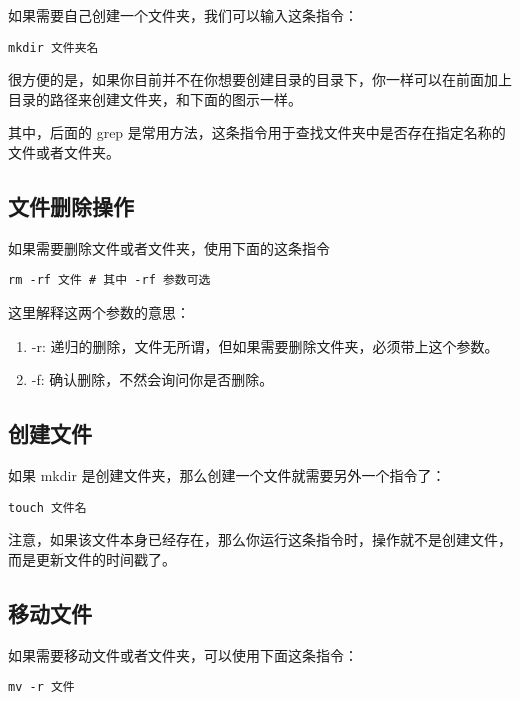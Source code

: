 \documentclass[UTF8]{gyh}
\begin{document}
如果需要自己创建一个文件夹，我们可以输入这条指令：

\begin{lstlisting}
mkdir 文件夹名
\end{lstlisting}

很方便的是，如果你目前并不在你想要创建目录的目录下，你一样可以在前面加上目录的路径来创建文件夹，和下面的图示一样。


其中，后面的 grep 是常用方法，这条指令用于查找文件夹中是否存在指定名称的文件或者文件夹。

\subsection{文件删除操作}

如果需要删除文件或者文件夹，使用下面的这条指令

\begin{lstlisting}
rm -rf 文件 # 其中 -rf 参数可选
\end{lstlisting}

这里解释这两个参数的意思：

\begin{enumerate}
\item -r: 递归的删除，文件无所谓，但如果需要删除文件夹，必须带上这个参数。


\item -f: 确认删除，不然会询问你是否删除。


\end{enumerate}
\subsection{创建文件}

如果 mkdir 是创建文件夹，那么创建一个文件就需要另外一个指令了：

\begin{lstlisting}
touch 文件名
\end{lstlisting}

注意，如果该文件本身已经存在，那么你运行这条指令时，操作就不是创建文件，而是更新文件的时间戳了。

\subsection{移动文件}

如果需要移动文件或者文件夹，可以使用下面这条指令：

\begin{lstlisting}
mv -r 文件
\end{lstlisting}
\end{document}
